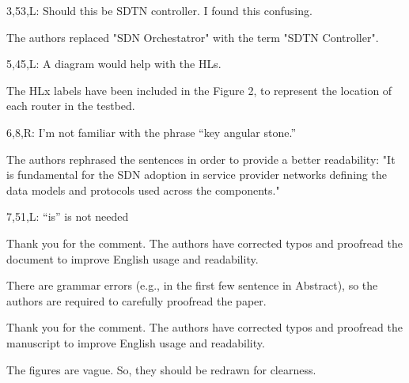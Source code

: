 \documentclass[12pt]{journalrebuttal}
\begin{document}
\begin{revcomment}
3,53,L: Should this be SDTN controller.  I found this confusing.
\end{revcomment}

\begin{response}
The authors replaced "SDN Orchestatror" with the term "SDTN Controller". 
\end{response}

\begin{revcomment}
5,45,L: A diagram would help with the HLs.
\end{revcomment}

\begin{response}
The HLx labels have been included in the Figure 2, to represent the location of each router in the testbed. 
\end{response}

\begin{revcomment}
6,8,R: I’m not familiar with the phrase “key angular stone.”
\end{revcomment}

\begin{response}
The authors rephrased the sentences in order to provide a better readability: "It is fundamental for the SDN adoption in service provider networks defining the data models and protocols used across the components."
\end{response}

\begin{revcomment}
7,51,L: “is” is not needed
\end{revcomment}

\begin{response}
Thank you for the comment. The authors have corrected typos and proofread the document to improve English usage and readability. 
\end{response}

\nextreviewer

\begin{revcomment}
There are grammar errors (e.g., in the first few sentence in Abstract), so the authors are required to carefully proofread the paper.
\end{revcomment}

\begin{response}
Thank you for the comment. The authors have corrected typos and proofread the manuscript to improve English usage and readability.
\end{response}

\begin{revcomment}
The figures are vague. So, they should be redrawn for clearness.
\end{revcomment}
\end{document}
